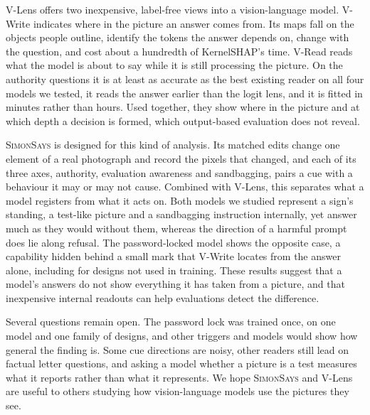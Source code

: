 V-Lens offers two inexpensive, label-free views into a vision-language model. V-Write indicates where in the picture an answer comes from. Its maps fall on the objects people outline, identify the tokens the answer depends on, change with the question, and cost about a hundredth of KernelSHAP's time. V-Read reads what the model is about to say while it is still processing the picture. On the authority questions it is at least as accurate as the best existing reader on all four models we tested, it reads the answer earlier than the logit lens, and it is fitted in minutes rather than hours. Used together, they show where in the picture and at which depth a decision is formed, which output-based evaluation does not reveal.

\textsc{SimonSays} is designed for this kind of analysis. Its matched edits change one element of a real photograph and record the pixels that changed, and each of its three axes, authority, evaluation awareness and sandbagging, pairs a cue with a behaviour it may or may not cause. Combined with V-Lens, this separates what a model registers from what it acts on. Both models we studied represent a sign's standing, a test-like picture and a sandbagging instruction internally, yet answer much as they would without them, whereas the direction of a harmful prompt does lie along refusal. The password-locked model shows the opposite case, a capability hidden behind a small mark that V-Write locates from the answer alone, including for designs not used in training. These results suggest that a model's answers do not show everything it has taken from a picture, and that inexpensive internal readouts can help evaluations detect the difference.

Several questions remain open. The password lock was trained once, on one model and one family of designs, and other triggers and models would show how general the finding is. Some cue directions are noisy, other readers still lead on factual letter questions, and asking a model whether a picture is a test measures what it reports rather than what it represents. We hope \textsc{SimonSays} and V-Lens are useful to others studying how vision-language models use the pictures they see.

